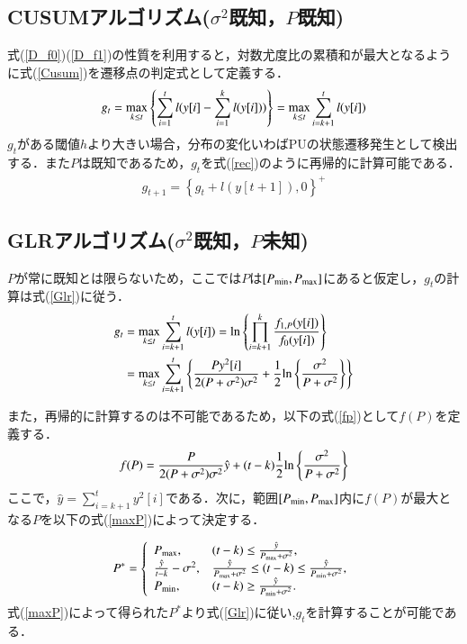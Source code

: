 \documentclass[10pt, twocolumn, a4j]{jsarticle}
\begin{document}
\subsection{CUSUMアルゴリズム($\sigma^2$既知，$P$既知)}
式(\ref{D_f0})(\ref{D_f1})の性質を利用すると，対数尤度比の累積和が最大となるように式(\ref{Cusum})を遷移点の判定式として定義する．
\begin{eqnarray}
g_t =  \mathop{\rm max}\limits_{k \leq t}\left\{\sum_{i=1}^tl(y[i]-\sum_{i=1}^kl(y[i]))\right\}=\mathop{\rm max}\limits_{k \leq t}\sum_{i=k+1}^tl(y[i])
\label{Cusum}
\end{eqnarray}
$g_t$がある閾値$h$より大きい場合，分布の変化いわばPUの状態遷移発生として検出する．また$P$は既知であるため，$g_t$を式(\ref{rec})のように再帰的に計算可能である．
\begin{eqnarray}
g_{t+1}=\left\{g_t+l(y[t+1]),0\right\}^{+}
\label{rec}
\end{eqnarray}

\subsection{GLRアルゴリズム($\sigma^2$既知，$P$未知)}
$P$が常に既知とは限らないため，ここでは$P$は$[P_{{\rm min}},P_{{\rm max}}]$にあると仮定し，$g_t$の計算は式(\ref{Glr})に従う．
\newpage
\begin{eqnarray}
g_t &= \mathop{\rm max}\limits_{k \leq t}\sum_{i=k+1}^tl(y[i])={\rm ln}\left\{\prod_{i=k+1}^k\frac{f_{1,P}(y[i])}{f_0(y[i])}\right\} \\ 
    &= \mathop{\rm max}\limits_{k \leq t}\sum_{i=k+1}^t\left\{ \frac{Py^2[i]}{2(P+\sigma^2)\sigma^2}+\frac{1}{2} {\rm ln}\left\{ \frac{\sigma^2}{P+\sigma^2}\right\} \right\} 
\label{Glr}
\end{eqnarray}

また，再帰的に計算するのは不可能であるため，以下の式(\ref{fp})として$f(P)$を定義する．
\begin{eqnarray}
f(P) = \frac{P}{2(P+\sigma^2)\sigma^2}\hat{y}+(t-k)\frac{1}{2}{\rm ln}\left\{ \frac{\sigma^2}{P+\sigma^2} \right\} 
\label{fp}
\end{eqnarray}
ここで，$\hat{y}=\sum_{i=k+1}^t y^2[i]$である．次に，範囲$[P_{{\rm min}},P_{{\rm max}}]$内に$f(P)$が最大となる$P$を以下の式(\ref{maxP})によって決定する．

\begin{equation}
P^{*}=
\left\{
\begin{array}{ll}
P_{{\rm max}}, & (t-k)\leq\frac{\hat{y}}{P_{{\rm max}}+\sigma^2}, \\
\frac{\hat{y}}{t-k}-\sigma^2, & \frac{\hat{y}}{P_{{\rm max}}+\sigma^2}\leq(t-k)\leq\frac{\hat{y}}{P_{{\rm min}}+\sigma^2}, \\
P_{{\rm min}}, & (t-k) \geq \frac{\hat{y}}{P_{{\rm min}}+\sigma^2}.
\end{array}
\right.
\label{maxP}
\end{equation}
式(\ref{maxP})によって得られた$P^{*}$より式(\ref{Glr})に従い,$g_t$を計算することが可能である．
\end{document}
